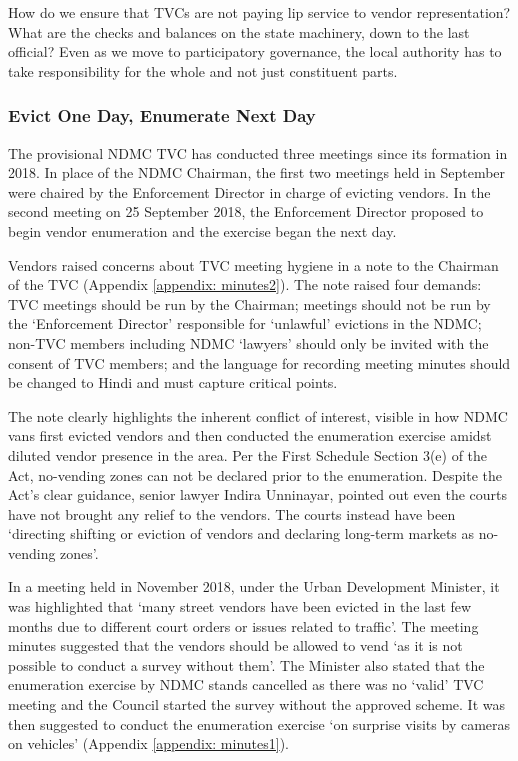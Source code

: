 \documentclass[a4paper, 12pt, twoside]{article}
\begin{document}
{{How do we ensure that TVCs are not paying lip service to vendor representation? What are the checks and balances on the state machinery, down to the last official? Even as we move to participatory governance, the local authority has to take responsibility for the whole and not just constituent parts.

\subsubsection*{Evict One Day, Enumerate Next Day}

The provisional NDMC TVC has conducted three meetings since its formation in 2018. In place of the NDMC Chairman, the first two meetings held in September were chaired by the Enforcement Director in charge of evicting vendors. In the second meeting on 25 September 2018, the Enforcement Director proposed to begin vendor enumeration and the exercise began the next day.  

Vendors raised concerns about TVC meeting hygiene in a note to the Chairman of the TVC (Appendix \ref{appendix: minutes2}). The note raised four demands: TVC meetings should be run by the Chairman; meetings should not be run by the `Enforcement Director' responsible for `unlawful' evictions in the NDMC; non-TVC members including NDMC ‘lawyers’ should only be invited with the consent of TVC members; and the language for recording meeting minutes should be changed to Hindi and must capture critical points. 

The note clearly highlights the inherent conflict of interest, visible in how NDMC vans first evicted vendors and then conducted the enumeration exercise amidst diluted vendor presence in the area. Per the First Schedule Section 3(e) of the Act, no-vending zones can not be declared prior to the enumeration. Despite the Act's clear guidance, senior lawyer Indira Unninayar, pointed out even the courts have not brought any relief to the vendors. The courts instead have been `directing shifting or eviction of vendors and declaring long-term markets as no-vending zones'.

In a meeting held in November 2018, under the Urban Development Minister, it was highlighted that `many street vendors have been evicted in the last few months due to different court orders or issues related to traffic'. The meeting minutes suggested that the vendors should be allowed to vend `as it is not possible to conduct a survey without them'. The Minister also stated that the enumeration exercise by NDMC stands cancelled as there was no ‘valid’ TVC meeting and the Council started the survey without the approved scheme. It was then suggested to conduct the enumeration exercise `on surprise visits by cameras on vehicles' (Appendix \ref{appendix: minutes1}). 


}}
\end{document}
